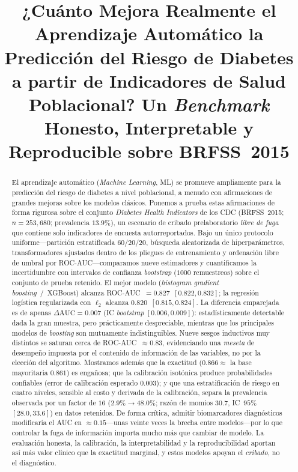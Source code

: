 \documentclass[conference]{IEEEtran}
\begin{document}
\title{¿Cuánto Mejora Realmente el Aprendizaje Automático la Predicción del Riesgo de
Diabetes a partir de Indicadores de Salud Poblacional? Un \emph{Benchmark} Honesto,
Interpretable y Reproducible sobre BRFSS~2015}

\author{
}

\maketitle

\begin{abstract}
El aprendizaje automático (\emph{Machine Learning}, ML) se promueve ampliamente para la predicción del riesgo de
diabetes a nivel poblacional, a menudo con afirmaciones de grandes mejoras sobre los
modelos clásicos. Ponemos a prueba estas afirmaciones de forma rigurosa sobre el conjunto
\emph{Diabetes Health Indicators} de los CDC (BRFSS~2015; $n=253{,}680$; prevalencia
$13.9\%$), un escenario de cribado prelaboratorio \emph{libre de fuga} que contiene solo
indicadores de encuesta autorreportados. Bajo un único protocolo uniforme---partición
estratificada $60/20/20$, búsqueda aleatorizada de hiperparámetros, transformadores
ajustados dentro de los pliegues de entrenamiento y ordenación libre de umbral por
ROC-AUC---comparamos nueve estimadores y cuantificamos la incertidumbre con intervalos de
confianza \emph{bootstrap} ($1000$ remuestreos) sobre el conjunto de prueba retenido. El
mejor modelo (\emph{histogram gradient boosting}~/~XGBoost) alcanza
ROC-AUC~$=0.827$~$[0.822,0.832]$; la regresión logística regularizada con $\ell_2$ alcanza
$0.820$~$[0.815,0.824]$. La diferencia emparejada es de apenas $\Delta\text{AUC}=0.007$
(IC \emph{bootstrap} $[0.006,0.009]$): estadísticamente detectable dada la gran muestra,
pero prácticamente despreciable, mientras que los principales modelos de \emph{boosting}
son mutuamente indistinguibles. Nueve sesgos inductivos muy distintos se saturan cerca de
ROC-AUC~$\approx0.83$, evidenciando una \emph{meseta} de desempeño impuesta por el
contenido de información de las variables, no por la elección del algoritmo. Mostramos
además que la exactitud ($0.866\approx$ la base mayoritaria $0.861$) es engañosa; que la
calibración isotónica produce probabilidades confiables (error de calibración esperado
$0.003$); y que una estratificación de riesgo en cuatro niveles, sensible al costo y
derivada de la calibración, separa la prevalencia observada por un factor de $16$
($2.9\%\!\to\!48.0\%$; razón de momios $30.7$, IC~$95\%$ $[28.0,33.6]$) en datos retenidos.
De forma crítica, admitir biomarcadores diagnósticos modificaría el AUC en
$\approx0.15$---unas veinte veces la brecha entre modelos---por lo que controlar la fuga de
información importa mucho más que cambiar de modelo. La evaluación honesta, la calibración,
la interpretabilidad y la reproducibilidad aportan así más valor clínico que la exactitud
marginal, y estos modelos apoyan el \emph{cribado}, no el diagnóstico.
\end{abstract}
\end{document}
